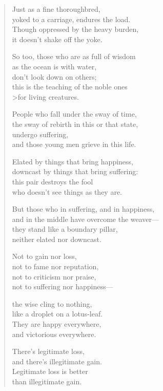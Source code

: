 \documentclass[12pt,openany]{book}%
\begin{document}
\begin{verse}%
Just as a fine thoroughbred, \\
yoked to a carriage, endures the load. \\
Though oppressed by the heavy burden, \\
it doesn’t shake off the yoke. 

So too, those who are as full of wisdom \\
as the ocean is with water, \\
don’t look down on others; \\
this is the teaching of the noble ones \\>for living creatures. 

People who fall under the sway of time, \\
the sway of rebirth in this or that state, \\
undergo suffering, \\
and those young men grieve in this life. 

Elated by things that bring happiness, \\
downcast by things that bring suffering: \\
this pair destroys the fool \\
who doesn’t see things as they are. 

But those who in suffering, and in happiness, \\
and in the middle have overcome the weaver—\\
they stand like a boundary pillar, \\
neither elated nor downcast. 

Not to gain nor loss, \\
not to fame nor reputation, \\
not to criticism nor praise, \\
not to suffering nor happiness—

the wise cling to nothing, \\
like a droplet on a lotus-leaf. \\
They are happy everywhere, \\
and victorious everywhere. 

There’s legitimate loss, \\
and there’s illegitimate gain. \\
Legitimate loss is better \\
than illegitimate gain. 


\end{verse}
\end{document}

